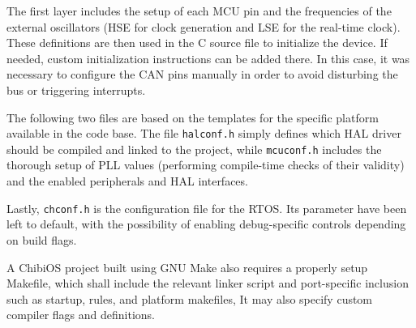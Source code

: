 The first layer includes the setup of each MCU pin and the frequencies of the external oscillators (HSE for clock generation and LSE for the real-time clock).
These definitions are then used in the C source file to initialize the device.
If needed, custom initialization instructions can be added there.
In this case, it was necessary to configure the CAN pins manually in order to avoid disturbing the bus or triggering interrupts.

The following two files are based on the templates for the specific platform available in the code base.
The file \texttt{halconf.h} simply defines which HAL driver should be compiled and linked to the project, while \texttt{mcuconf.h} includes the thorough setup of PLL values (performing compile-time checks of their validity) and the enabled peripherals and HAL interfaces.

Lastly, \texttt{chconf.h} is the configuration file for the RTOS.
Its parameter have been left to default, with the possibility of enabling debug-specific controls depending on build flags.

A ChibiOS project built using GNU Make also requires a properly setup Makefile, which shall include the relevant linker script and port-specific inclusion such as startup, rules, and platform makefiles,
It may also specify custom compiler flags and definitions.

